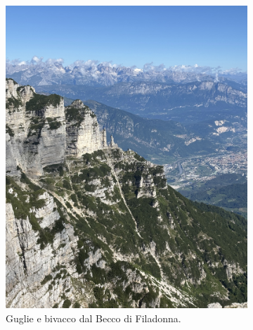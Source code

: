 \documentclass{article}
\begin{document}
\begin{figure}[htbp!]
    \centering
    \begin{subfigure}[b]{0.45\textwidth}
        \includegraphics[width=\textwidth]{images/foto_guglie.jpg}
        \caption{Guglie e bivacco dal Becco di Filadonna.}
    \end{subfigure}
    \hfill
    \begin{subfigure}[b]{0.45\textwidth}

\end{subfigure}
\end{figure}
\end{document}
